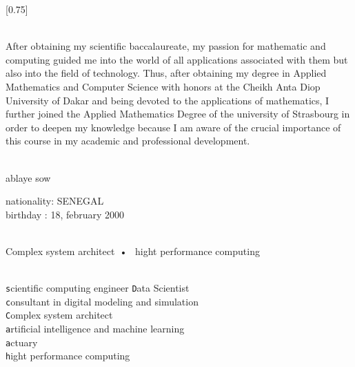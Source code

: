 \documentclass[lighthipster]{simplehipstercv}
\begin{document}
\setlength{\columnsep}{1.5cm}
[0.75]
\begin{paracol}{2}

\paracolbackgroundoptions



\footnotesize
{\setasidefontcolour
\flushright
\begin{center}
\end{center}

\\[0.3em]

{\footnotesize
After obtaining my scientific baccalaureate, my passion for mathematic and computing guided me 
into the world of all applications associated with them but also into the field of technology.
Thus, after obtaining my degree in Applied Mathematics and Computer Science with honors at the 
Cheikh Anta Diop University of Dakar and being devoted to the applications of mathematics, 
I further joined the Applied Mathematics Degree of the university of Strasbourg in order to 
deepen my knowledge because I am aware of the crucial importance of this course in my academic
and professional development.}
\bigskip

 \\[0.5em]
ablaye sow

nationality: SENEGAL\\
birthday : 18, february 2000

\bigskip

 \\[0.5em]

Complex system architect~•~ hight performance computing 

\bigskip

\\[0.3em]

\texttt scientific computing engineer
\texttt Data Scientist\\
\texttt consultant in digital modeling and simulation\\
\texttt Complex system architect\\
\texttt artificial intelligence and machine learning\\
\texttt actuary\\
\texttt hight performance computing\\

}
\end{paracol}
\end{document}
